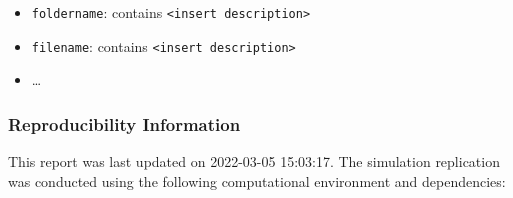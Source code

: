 \documentclass[10,a4paperpaper,]{article}
\begin{document}
\begin{itemize}
\tightlist
\item
  \texttt{foldername}: contains
  \texttt{\textless{}insert\ description\textgreater{}}
\item
  \texttt{filename}: contains
  \texttt{\textless{}insert\ description\textgreater{}}
\item
  \ldots{}
\end{itemize}

\subsubsection*{Reproducibility Information}

This report was last updated on 2022-03-05 15:03:17. The simulation
replication was conducted using the following computational environment
and dependencies:

\FloatBarrier
\end{document}
